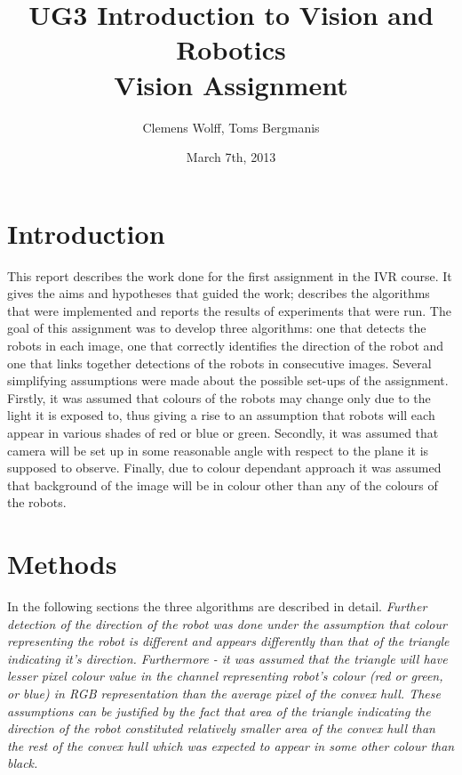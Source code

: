 \documentclass[10pt,a4paper]{article}
\title{UG3 Introduction to Vision and Robotics \\ Vision Assignment}
\author{Clemens Wolff, Toms Bergmanis}
\date{March 7th, 2013}
\begin{document}
\maketitle

\section{Introduction}\label{intro}
This report describes the work done for the first assignment in the IVR course. 
It gives the aims and hypotheses that guided the work; describes the algorithms 
that were implemented and reports the results of experiments that were run.
The goal of this assignment was to develop three algorithms: one that detects 
the robots in each image, one that correctly identifies the direction of the 
robot and one that links together detections of the robots in consecutive 
images. 
Several simplifying assumptions were made about the possible set-ups of the 
assignment.  Firstly, it was assumed that colours of the robots may change only 
due to the light it is exposed to, thus giving a rise to an assumption that 
robots will each appear in various shades of red or blue or green. Secondly, it 
was assumed that camera will be set up in some reasonable angle with respect to 
the plane it is supposed to observe. Finally, due to colour dependant approach 
it was assumed that background of the image will be in colour other than any of 
the colours of the robots.


\section{Methods}\label{methods}
In the following sections the three algorithms are described in detail. 
\textit{
Further detection of the direction of the robot was done under the 
assumption that colour representing the robot is different and appears 
differently than that of the triangle indicating it's direction. 
Furthermore - it was assumed that the triangle will have lesser pixel 
colour value in the channel representing robot's colour (red or green, or 
blue) in RGB representation than the average pixel of the convex hull. 
These assumptions can be justified by the fact that area of the triangle 
indicating the direction of the robot constituted relatively smaller area 
of the convex hull than the rest of the convex hull which was expected to 
appear in some other colour than black.
} 
\end{document}
